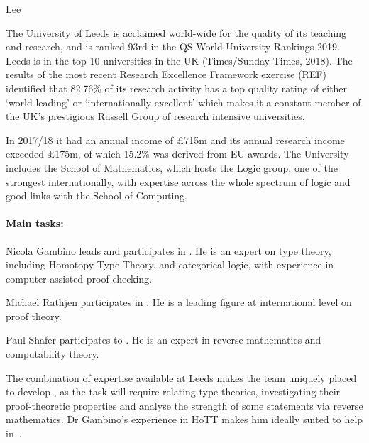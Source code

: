 \begin{sitedescription}{Lee}


The University of Leeds is acclaimed world-wide for the quality of its teaching and research, and is ranked 93rd in the QS World University Rankings 2019. Leeds is in the top 10 universities in the UK (Times/Sunday Times, 2018). The results of the most recent Research Excellence Framework exercise (REF) identified that 82.76\% 
of its research activity has a top quality rating of either `world leading' or `internationally excellent' which makes it a constant member of the UK's prestigious Russell Group of research intensive universities. 

In 2017/18 it had an annual income of \pounds 715m and its annual research income exceeded \pounds 175m, of which 15.2\% was derived from EU awards. The University includes the School of Mathematics,
which hosts the Logic group, one of the strongest internationally, with expertise across the whole
spectrum of logic and good links with the School of Computing.




\paragraph*{Main tasks:}

\begin{compactitem}
\item Nicola Gambino leads   and participates in . He is an expert on type theory,
including Homotopy Type Theory, and categorical logic, with experience in computer-assisted proof-checking. 
\item Michael Rathjen participates in . He is a leading figure at international level
on proof theory. 
\item Paul Shafer participates to  . He is an expert in reverse mathematics
and computability theory.
\end{compactitem}
The combination of expertise available at Leeds makes the team uniquely placed to develop  ,
as the task will require relating type theories, investigating their proof-theoretic properties and analyse the strength of some
statements via reverse mathematics. Dr Gambino's experience in HoTT makes him ideally suited to help in~.



\end{sitedescription}
